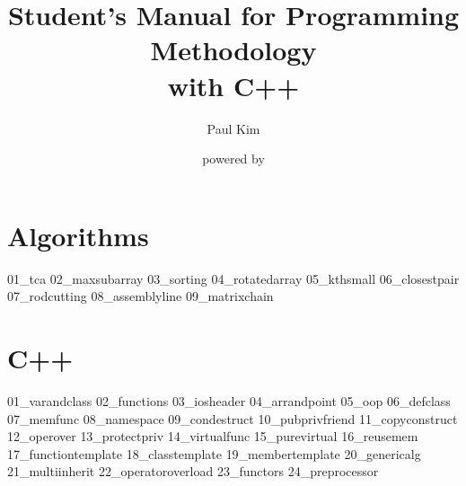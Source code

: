 \documentclass[10pt,openany,a4pper]{book}
\begin{document}
\begin{titlepage}
    \title{Student's Manual for Programming Methodology\\{\Large with C++}}
    \author{Paul Kim}
    \date{powered by \LaTeXe{}}
\maketitle
\end{titlepage}
\tableofcontents
\newpage

\part{Algorithms}

{01_tca}
{02_maxsubarray}
{03_sorting}
{04_rotatedarray}
{05_kthsmall}
{06_closestpair}
{07_rodcutting}
{08_assemblyline}
{09_matrixchain}

\part{C++}

{01_varandclass}
{02_functions}
{03_iosheader}
{04_arrandpoint}
{05_oop}
{06_defclass}
{07_memfunc}
{08_namespace}
{09_condestruct}
{10_pubprivfriend}
{11_copyconstruct}
{12_operover}
{13_protectpriv}
{14_virtualfunc}
{15_purevirtual}
{16_reusemem}
{17_functiontemplate}
{18_classtemplate}
{19_membertemplate}
{20_genericalg}
{21_multiinherit}
{22_operatoroverload}
{23_functors}
{24_preprocessor}
\end{document}

